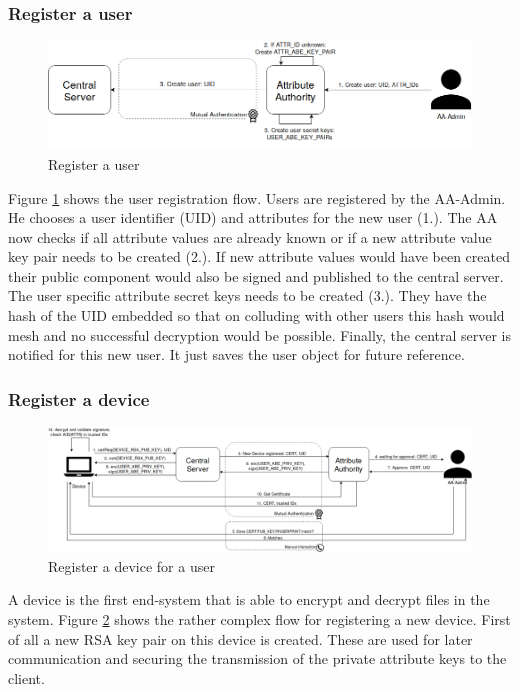 \subsubsection{Register a user}
\begin{figure}[!h]
\centering
    \includegraphics[width=\linewidth]{img/user_register.png}
    \caption{Register a user}
    \label{fig:user-register}
\end{figure}

Figure \ref{fig:user-register} shows the user registration flow. Users are registered by the AA-Admin. He chooses a user identifier (UID) and attributes for the new user (1.).  The AA now checks if all attribute values are already known or if a new attribute value key pair needs to be created (2.). If new attribute values would have been created their public component would also be signed and published to the central server. The user specific attribute secret keys needs to be created (3.). They have the hash of the UID embedded so that on colluding with other users this hash would mesh and no successful decryption would be possible. Finally, the central server is notified for this new user. It just saves the user object for future reference.

\subsubsection{Register a device}
\begin{figure}[!h]
\centering
    \includegraphics[width=\linewidth]{img/device_register.png}
    \caption{Register a device for a user}
    \label{fig:device-register}
\end{figure}

A device is the first end-system that is able to encrypt and decrypt files in the system. Figure \ref{fig:device-register} shows the rather complex flow for registering a new device. First of all a new RSA key pair on this device is created. These are used for later communication and securing the transmission of the private attribute keys to the client. 


